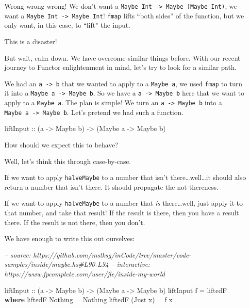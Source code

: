 \documentclass[]{article}
\newenvironment{Shaded}{}{}
\newcommand{\CommentTok}[1]{\textcolor[rgb]{0.38,0.63,0.69}{\textit{#1}}}
\newcommand{\DataTypeTok}[1]{\textcolor[rgb]{0.56,0.13,0.00}{#1}}
\newcommand{\FunctionTok}[1]{\textcolor[rgb]{0.02,0.16,0.49}{#1}}
\newcommand{\KeywordTok}[1]{\textcolor[rgb]{0.00,0.44,0.13}{\textbf{#1}}}
\newcommand{\NormalTok}[1]{#1}
\newcommand{\OtherTok}[1]{\textcolor[rgb]{0.00,0.44,0.13}{#1}}
\begin{document}
Wrong wrong wrong! We don't want a
\texttt{Maybe\ Int\ -\textgreater{}\ Maybe\ (Maybe\ Int)}, we want a
\texttt{Maybe\ Int\ -\textgreater{}\ Maybe\ Int}! \texttt{fmap} lifts ``both
sides'' of the function, but we only want, in this case, to ``lift'' the input.

This is a disaster!

But wait, calm down. We have overcome similar things before. With our recent
journey to Functor enlightenment in mind, let's try to look for a similar path.

We had an \texttt{a\ -\textgreater{}\ b} that we wanted to apply to a
\texttt{Maybe\ a}, we used \texttt{fmap} to turn it into a
\texttt{Maybe\ a\ -\textgreater{}\ Maybe\ b}. So we have a
\texttt{a\ -\textgreater{}\ Maybe\ b} here that we want to apply to a
\texttt{Maybe\ a}. The plan is simple! We turn an
\texttt{a\ -\textgreater{}\ Maybe\ b} into a
\texttt{Maybe\ a\ -\textgreater{}\ Maybe\ b}. Let's pretend we had such a
function.

\begin{Shaded}
\begin{Highlighting}[]
\OtherTok{liftInput ::}\NormalTok{ (a }\OtherTok{->} \DataTypeTok{Maybe}\NormalTok{ b) }\OtherTok{->}\NormalTok{ (}\DataTypeTok{Maybe}\NormalTok{ a }\OtherTok{->} \DataTypeTok{Maybe}\NormalTok{ b)}
\end{Highlighting}
\end{Shaded}

How should we expect this to behave?

Well, let's think this through case-by-case.

If we want to apply \texttt{halveMaybe} to a number that isn't
there\ldots{}well\ldots{}it should also return a number that isn't there. It
should propagate the not-thereness.

If we want to apply \texttt{halveMaybe} to a number that \emph{is}
there\ldots{}well, just apply it to that number, and take that result! If the
result is there, then you have a result there. If the result is not there, then
you don't.

We have enough to write this out ourselves:

\begin{Shaded}
\begin{Highlighting}[]
\CommentTok{-- source: https://github.com/mstksg/inCode/tree/master/code-samples/inside/maybe.hs#L90-L94}
\CommentTok{-- interactive: https://www.fpcomplete.com/user/jle/inside-my-world}

\OtherTok{liftInput ::}\NormalTok{ (a }\OtherTok{->} \DataTypeTok{Maybe}\NormalTok{ b) }\OtherTok{->}\NormalTok{ (}\DataTypeTok{Maybe}\NormalTok{ a }\OtherTok{->} \DataTypeTok{Maybe}\NormalTok{ b)}
\NormalTok{liftInput f }\FunctionTok{=}\NormalTok{ liftedF}
  \KeywordTok{where}
\NormalTok{    liftedF }\DataTypeTok{Nothing}  \FunctionTok{=} \DataTypeTok{Nothing}
\NormalTok{    liftedF (}\DataTypeTok{Just}\NormalTok{ x) }\FunctionTok{=}\NormalTok{ f x}
\end{Highlighting}
\end{Shaded}
\end{document}
